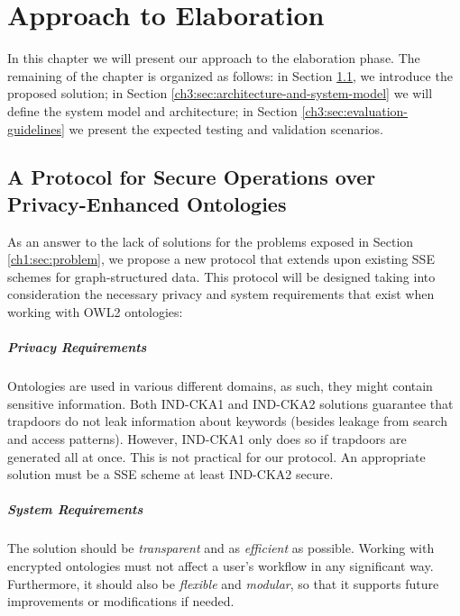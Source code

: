 
\chapter{Approach to Elaboration}
\label{cha:approach-to-elaboration}


In this chapter we will present our approach to the elaboration phase. The remaining of
the chapter is organized as follows: in Section \ref{ch3:sec:solution}, we introduce the proposed solution; in Section \ref{ch3:sec:architecture-and-system-model} we will define the system model and architecture; in Section \ref{ch3:sec:evaluation-guidelines} we present the expected testing and validation scenarios.

\section{A Protocol for Secure Operations over Privacy-Enhanced Ontologies}
\label{ch3:sec:solution}

As an answer to the lack of solutions for the problems exposed in Section \ref{ch1:sec:problem}, we propose a new protocol that extends upon existing \gls{SSE} schemes for graph-structured data. This protocol will be designed taking into consideration the necessary privacy and system requirements that exist when working with \gls{OWL2} ontologies:


\paragraph{Privacy Requirements}

Ontologies are used in various different domains, as such, they might contain sensitive information.
Both \gls{IND-CKA1} and \gls{IND-CKA2} solutions guarantee that trapdoors do not leak information about keywords (besides leakage from search and access patterns). However, \gls{IND-CKA1} only does so if trapdoors are generated all at once. This is not practical for our protocol. An appropriate solution must be a \gls{SSE} scheme at least \gls{IND-CKA2} secure.

\paragraph{System Requirements}
The solution should be \emph{transparent} and as \emph{efficient} as possible. Working with encrypted ontologies must not affect a user's workflow in any significant way. Furthermore, it should also be \emph{flexible} and \emph{modular}, so that it supports future improvements or modifications if needed.

